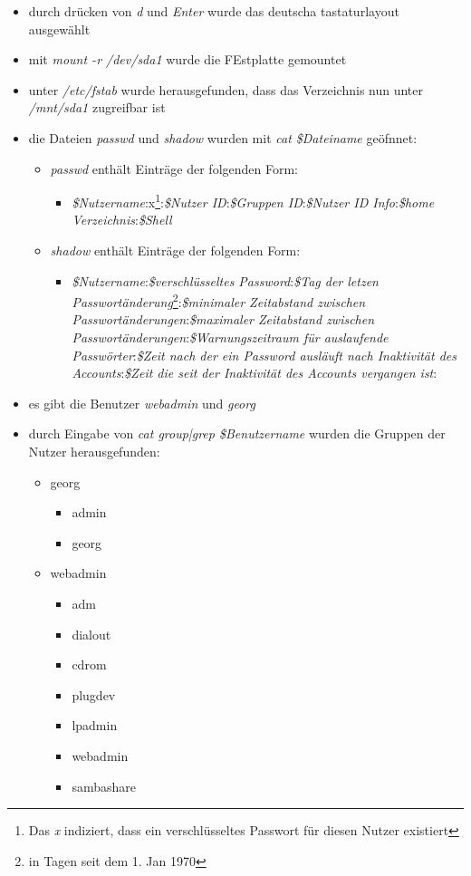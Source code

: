 \documentclass[twoside]{article}
\newcommand{\tit}[1]{\textit{#1}}
\begin{document}
\begin{itemize}
	\item durch drücken von \tit{d} und \tit{Enter} wurde das deutscha tastaturlayout ausgewählt
	\item mit \tit{mount -r /dev/sda1} wurde die FEstplatte gemountet
	\item unter \tit{/etc/fstab} wurde herausgefunden, dass das Verzeichnis nun unter \tit{/mnt/sda1} zugreifbar ist
	\item die Dateien \tit{passwd} und \tit{shadow} wurden mit \tit{cat \$Dateiname} geöfnnet:
	\begin{itemize}
		\item \tit{passwd} enthält Einträge der folgenden Form: \cite{1}
		\begin{itemize}
			\item \tit{\$Nutzername}:x\footnote{Das \tit{x} indiziert, dass ein verschlüsseltes Passwort für diesen Nutzer existiert}:\tit{\$Nutzer ID}:\tit{\$Gruppen ID}:\tit{\$Nutzer ID Info}:\tit{\$home Verzeichnis}:\tit{\$Shell}
		\end{itemize}
		\item \tit{shadow} enthält Einträge der folgenden Form: \cite{2}
		\begin{itemize}
			\item \tit{\$Nutzername}:\tit{\$verschlüsseltes Password}:\tit{\$Tag der letzen Passwortänderung}\footnote{in Tagen seit dem 1. Jan 1970}:\tit{\$minimaler Zeitabstand zwischen Passwortänderungen}:\tit{\$maximaler Zeitabstand zwischen Passwortänderungen}:\tit{\$Warnungszeitraum für auslaufende Passwörter}:\tit{\$Zeit nach der ein Password ausläuft nach Inaktivität des Accounts}:\tit{\$Zeit die seit der Inaktivität des Accounts vergangen ist}:
		\end{itemize}
	\end{itemize}
	\item es gibt die Benutzer \tit{webadmin} und \tit{georg}
	\item durch Eingabe von \tit{cat group|grep \$Benutzername} wurden die Gruppen der Nutzer herausgefunden:
	\begin{itemize}
		\item georg
		\begin{itemize}
			\item admin
			\item georg
		\end{itemize}
		\item webadmin
		\begin{itemize}
			\item adm
			\item dialout
			\item cdrom
			\item plugdev
			\item lpadmin
			\item webadmin
			\item sambashare
		\end{itemize}
	\end{itemize}
\end{itemize}
\end{document}
